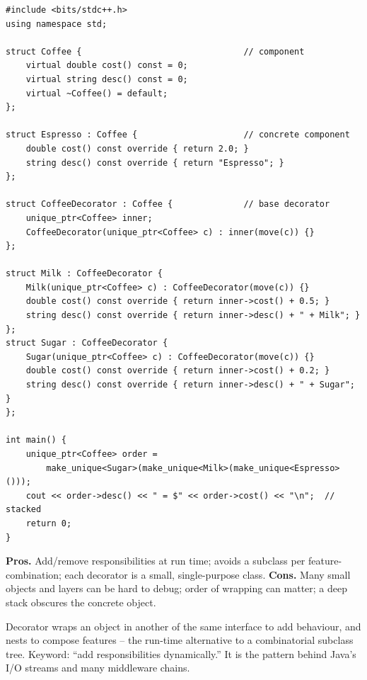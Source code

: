 \begin{lstlisting}
#include <bits/stdc++.h>
using namespace std;

struct Coffee {                                // component
    virtual double cost() const = 0;
    virtual string desc() const = 0;
    virtual ~Coffee() = default;
};

struct Espresso : Coffee {                     // concrete component
    double cost() const override { return 2.0; }
    string desc() const override { return "Espresso"; }
};

struct CoffeeDecorator : Coffee {              // base decorator
    unique_ptr<Coffee> inner;
    CoffeeDecorator(unique_ptr<Coffee> c) : inner(move(c)) {}
};

struct Milk : CoffeeDecorator {
    Milk(unique_ptr<Coffee> c) : CoffeeDecorator(move(c)) {}
    double cost() const override { return inner->cost() + 0.5; }
    string desc() const override { return inner->desc() + " + Milk"; }
};
struct Sugar : CoffeeDecorator {
    Sugar(unique_ptr<Coffee> c) : CoffeeDecorator(move(c)) {}
    double cost() const override { return inner->cost() + 0.2; }
    string desc() const override { return inner->desc() + " + Sugar"; }
};

int main() {
    unique_ptr<Coffee> order =
        make_unique<Sugar>(make_unique<Milk>(make_unique<Espresso>()));
    cout << order->desc() << " = $" << order->cost() << "\n";  // stacked
    return 0;
}
\end{lstlisting}

\begin{complexitybox}
\textbf{Pros.} Add/remove responsibilities at run time; avoids a subclass
per feature-combination; each decorator is a small, single-purpose class.
\textbf{Cons.} Many small objects and layers can be hard to debug; order
of wrapping can matter; a deep stack obscures the concrete object.
\end{complexitybox}

\begin{takeawaybox}
Decorator wraps an object in another of the same interface to add
behaviour, and nests to compose features -- the run-time alternative to a
combinatorial subclass tree. Keyword: ``add responsibilities dynamically.''
It is the pattern behind Java's I/O streams and many middleware chains.
\end{takeawaybox}
